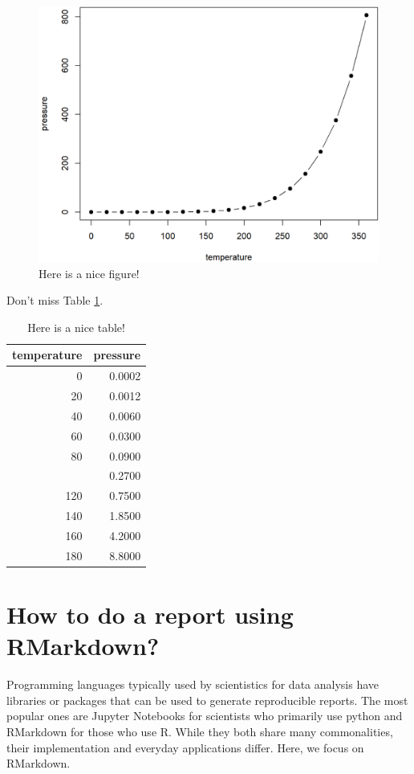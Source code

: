 \documentclass[
]{book}
\theoremstyle{definition}
\theoremstyle{definition}
\theoremstyle{definition}
\theoremstyle{definition}
\theoremstyle{remark}
\begin{document}
\begin{figure}

{\centering \includegraphics[width=0.8\linewidth]{figures/nice-fig-1} 

}

\caption{Here is a nice figure!}\label{fig:nice-fig}
\end{figure}

Don't miss Table \ref{tab:nice-tab}.

\begin{table}

\caption{\label{tab:nice-tab}Here is a nice table!}
\centering
\begin{tabular}[t]{rr}
\toprule
temperature & pressure\\
\midrule
0 & 0.0002\\
20 & 0.0012\\
40 & 0.0060\\
60 & 0.0300\\
80 & 0.0900\\
\addlinespace
100 & 0.2700\\
120 & 0.7500\\
140 & 1.8500\\
160 & 4.2000\\
180 & 8.8000\\
\bottomrule
\end{tabular}
\end{table}

\hypertarget{how-to-do-a-report-using-rmarkdown}{%
\section{How to do a report using RMarkdown?}\label{how-to-do-a-report-using-rmarkdown}}

Programming languages typically used by scientistics for data analysis have libraries or packages that can be used to generate reproducible reports. The most popular ones are Jupyter Notebooks for scientists who primarily use python and RMarkdown for those who use R. While they both share many commonalities, their implementation and everyday applications differ. Here, we focus on RMarkdown.
\end{document}
